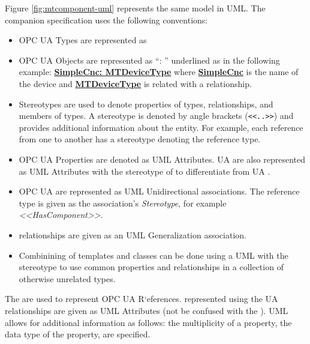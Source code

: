 

Figure \ref{fig:mtcomponent-uml} represents the same model in UML. The companion specification uses the following conventions:

\begin{itemize}
  \item OPC UA Types are represented as 
  \item OPC UA Objects are represented as ``: '' underlined as in the following example: \textbf{\underline{SimpleCnc: MTDeviceType}} where \textbf{\underline{SimpleCnc}} is the name of the device and  \textbf{\underline{MTDeviceType}} is related with a  relationship.
  \item Stereotypes are used to denote properties of types, relationships, and members of types. A stereotype is denoted by angle brackets (\texttt{<<..>>}) and provides additional information about the entity. For example, each reference from one  to another has a stereotype denoting the reference type.
  \item OPC UA Properties are denoted as UML Attributes. UA  are also represented as UML Attributes with the stereotype of  to differentiate from UA .
  \item OPC UA   are represented as UML Unidirectional associations. The reference type is given as the association's \textit{Stereotype}, for example \textit{<<HasComponent>>}. 
  \item {} relationships are given as an UML Generalization association.
  \item Combinining of templates and classes can be done using a UML  with the stereotype  to use common properties and relationships in a collection of otherwise unrelated types.
\end{itemize}

The  are used to represent OPC UA R`eferences.  represented using the UA  relationships are given as UML Attributes (not be confused with the ). UML allows for additional information as follows:  the multiplicity of a property, the data type of the property, are specified.


\FloatBarrier


